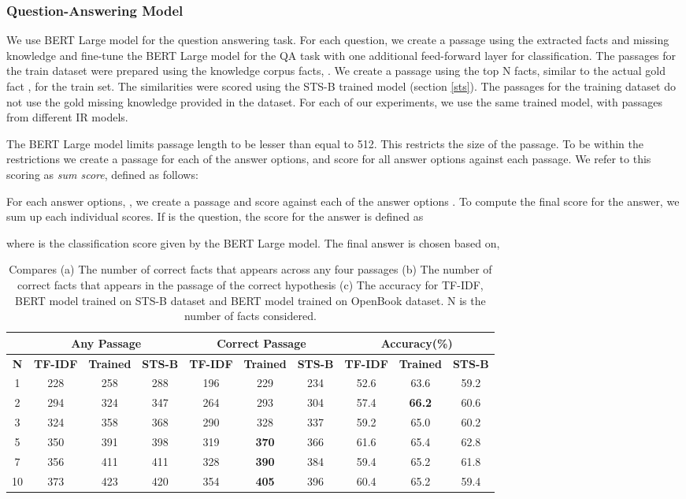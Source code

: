\documentclass[11pt,a4paper]{article}
\begin{document}
\subsubsection{Question-Answering Model}
We use BERT Large model for the question answering task. For each question, we create a passage using the extracted facts and missing knowledge and fine-tune the BERT Large model for the QA task with one additional feed-forward layer for classification. The passages for the train dataset were prepared using the knowledge corpus facts, . We create a passage using  the top N  facts, similar to the actual gold fact , for the train set. The similarities were scored using the STS-B trained model (section \ref{sts}). The passages for the training dataset do not use the gold missing knowledge  provided in the dataset. For each of our experiments, we use the same trained model, with passages from different IR models.

The BERT Large model limits passage length to be lesser than equal to 512. This restricts the size of the passage. To be within the restrictions we create a passage for each of the answer options, and score for all answer options against each passage. We refer to this scoring as \textit{sum score}, defined as follows:

For each answer options, , we create a passage  and score against each of the  answer options . To compute the final score for the answer, we sum up each individual scores. If  is the question, the score for the answer is defined as

where  is the classification score given by the BERT Large model.
The final answer is chosen based on, 


\begin{table*}[!t]
\centering
\begin{tabular}{|c|ccc|ccc|ccc|}
\hline
& \multicolumn{3}{c|}{\textbf{Any Passage}} & \multicolumn{3}{c|}{ \textbf{Correct Passage}} & \multicolumn{3}{c|}{\textbf{Accuracy(\%)}} \\
\hline
\textbf{N} &\textbf{TF-IDF}&\textbf{Trained}&\textbf{STS-B}&\textbf{TF-IDF}&\textbf{Trained}&\textbf{STS-B}&\textbf{TF-IDF}&\textbf{Trained}&\textbf{STS-B}\\
\hline
1&228&258&288&196&229&234&52.6&63.6&59.2\\
2&294&324&347&264&293&304&57.4&\textbf{66.2}&60.6\\
3&324&358&368&290&328&337&59.2&65.0&60.2\\
5&350&391&398&319&\textbf{370}&366&61.6&65.4&62.8\\
7&356&411&411&328&\textbf{390}&384&59.4&65.2&61.8\\
10&373&423&420&354&\textbf{405}&396&60.4&65.2&59.4\\
\hline
\end{tabular}
\caption{Compares (a) The number of correct facts that appears across any four passages (b) The number of correct facts that appears in the passage of the correct hypothesis (c) The accuracy for TF-IDF, BERT model trained on STS-B dataset and BERT model trained on OpenBook dataset. N is the number of facts considered.
  }
\label{exp:f1}
\end{table*}
\end{document}

